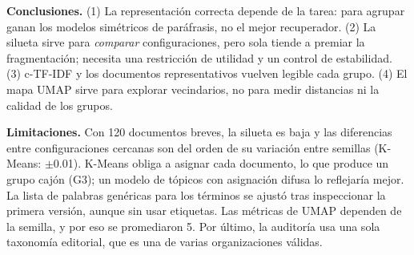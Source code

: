 \documentclass[10pt,a4paper]{article}
\begin{document}
\textbf{Conclusiones.} (1) La representación correcta depende de la tarea: para agrupar ganan los modelos
simétricos de paráfrasis, no el mejor recuperador. (2) La silueta sirve para \emph{comparar} configuraciones,
pero sola tiende a premiar la fragmentación; necesita una restricción de utilidad y un control de estabilidad.
(3) c-TF-IDF y los documentos representativos vuelven legible cada grupo. (4) El mapa UMAP sirve para
explorar vecindarios, no para medir distancias ni la calidad de los grupos.

\textbf{Limitaciones.} Con 120 documentos breves, la silueta es baja y las diferencias entre configuraciones
cercanas son del orden de su variación entre semillas (K-Means: $\pm$0.01). K-Means obliga a asignar cada
documento, lo que produce un grupo cajón (G3); un modelo de tópicos con asignación difusa lo reflejaría
mejor. La lista de palabras genéricas para los términos se ajustó tras inspeccionar la primera versión,
aunque sin usar etiquetas. Las métricas de UMAP dependen de la semilla, y por eso se promediaron 5. Por
último, la auditoría usa una sola taxonomía editorial, que es una de varias organizaciones válidas.
\end{document}
